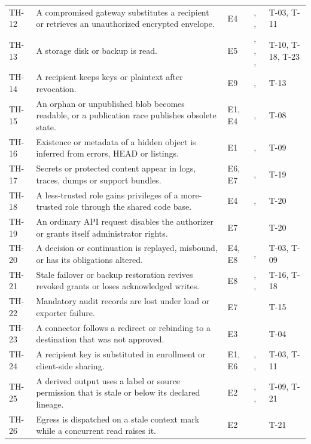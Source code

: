 \begin{longtable}{@{}P{0.07\textwidth}P{0.34\textwidth}P{0.08\textwidth}P{0.29\textwidth}P{0.12\textwidth}@{}}
TH-12 & A compromised gateway substitutes a recipient or retrieves an unauthorized encrypted envelope. & E4 & , ,  & T-03, T-11\\
TH-13 & A storage disk or backup is read. & E5 & , , ,  & T-10, T-18, T-23\\
TH-14 & A recipient keeps keys or plaintext after revocation. & E9 & ,  & T-13\\
TH-15 & An orphan or unpublished blob becomes readable, or a publication race publishes obsolete state. & E1, E4 & ,  & T-08\\
TH-16 & Existence or metadata of a hidden object is inferred from errors, HEAD or listings. & E1 & ,  & T-09\\
TH-17 & Secrets or protected content appear in logs, traces, dumps or support bundles. & E6, E7 & ,  & T-19\\
TH-18 & A less-trusted role gains privileges of a more-trusted role through the shared code base. & E4 & ,  & T-20\\
TH-19 & An ordinary API request disables the authorizer or grants itself administrator rights. & E7 &  & T-20\\
TH-20 & A decision or continuation is replayed, misbound, or has its obligations altered. & E4, E8 & ,  & T-03, T-09\\
TH-21 & Stale failover or backup restoration revives revoked grants or loses acknowledged writes. & E8 & , ,  & T-16, T-18\\
TH-22 & Mandatory audit records are lost under load or exporter failure. & E7 &  & T-15\\
TH-23 & A connector follows a redirect or rebinding to a destination that was not approved. & E3 &  & T-04\\
TH-24 & A recipient key is substituted in enrollment or client-side sharing. & E1, E6 & , ,  & T-03, T-11\\
TH-25 & A derived output uses a label or source permission that is stale or below its declared lineage. & E2 & , ,  & T-09, T-21\\
TH-26 & Egress is dispatched on a stale context mark while a concurrent read raises it. & E2 &  & T-21\\

\end{longtable}
